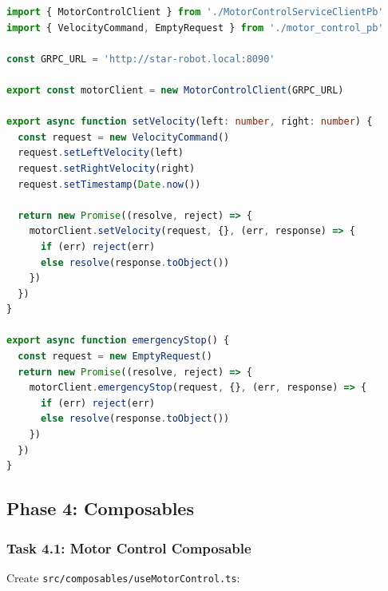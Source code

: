 \begin{lstlisting}[language=TypeScript, caption=grpc/client.ts]
import { MotorControlClient } from './MotorControlServiceClientPb'
import { VelocityCommand, EmptyRequest } from './motor_control_pb'

const GRPC_URL = 'http://star-robot.local:8090'

export const motorClient = new MotorControlClient(GRPC_URL)

export async function setVelocity(left: number, right: number) {
  const request = new VelocityCommand()
  request.setLeftVelocity(left)
  request.setRightVelocity(right)
  request.setTimestamp(Date.now())

  return new Promise((resolve, reject) => {
    motorClient.setVelocity(request, {}, (err, response) => {
      if (err) reject(err)
      else resolve(response.toObject())
    })
  })
}

export async function emergencyStop() {
  const request = new EmptyRequest()
  return new Promise((resolve, reject) => {
    motorClient.emergencyStop(request, {}, (err, response) => {
      if (err) reject(err)
      else resolve(response.toObject())
    })
  })
}
\end{lstlisting}

\subsection{Phase 4: Composables}

\subsubsection{Task 4.1: Motor Control Composable}

Create \texttt{src/composables/useMotorControl.ts}:

